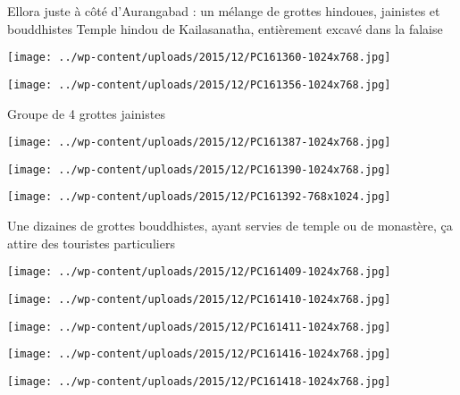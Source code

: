  \newline
 Ellora juste à côté d'Aurangabad : un mélange de grottes hindoues, jainistes et bouddhistes \newline
 Temple hindou de Kailasanatha, entièrement excavé dans la falaise \newline
 \newline
\centerline{\texttt{[image: ../wp-content/uploads/2015/12/PC161360-1024x768.jpg]} } 
 \newline
 \newline
\centerline{\texttt{[image: ../wp-content/uploads/2015/12/PC161356-1024x768.jpg]} } 
 \newline
 Groupe de 4 grottes jainistes \newline
 \newline
\centerline{\texttt{[image: ../wp-content/uploads/2015/12/PC161387-1024x768.jpg]} } 
 \newline
 \newline
\centerline{\texttt{[image: ../wp-content/uploads/2015/12/PC161390-1024x768.jpg]} } 
 \newline
 \newline
\centerline{\texttt{[image: ../wp-content/uploads/2015/12/PC161392-768x1024.jpg]} } 
 \newline
 Une dizaines de grottes bouddhistes, ayant servies de temple ou de monastère, ça attire des touristes particuliers \newline
 \newline
\centerline{\texttt{[image: ../wp-content/uploads/2015/12/PC161409-1024x768.jpg]} } 
 \newline
 \newline
\centerline{\texttt{[image: ../wp-content/uploads/2015/12/PC161410-1024x768.jpg]} } 
 \newline
 \newline
\centerline{\texttt{[image: ../wp-content/uploads/2015/12/PC161411-1024x768.jpg]} } 
 \newline
 \newline
\centerline{\texttt{[image: ../wp-content/uploads/2015/12/PC161416-1024x768.jpg]} } 
 \newline
 \newline
\centerline{\texttt{[image: ../wp-content/uploads/2015/12/PC161418-1024x768.jpg]} } 
 \newline
 \newline
